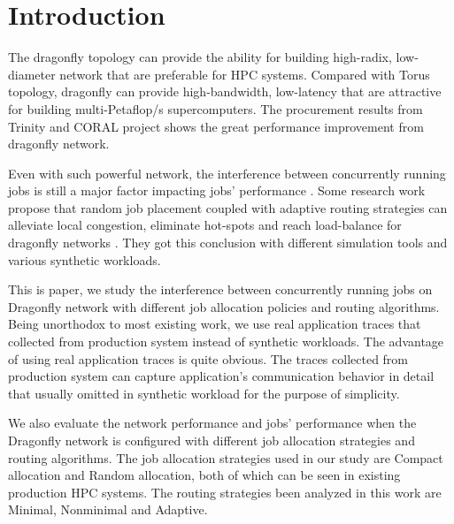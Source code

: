 \documentclass[conference,compsoc]{IEEEtran}
\begin{document}




%
\IEEEpeerreviewmaketitle



\section{Introduction}
\label{sec:intro}

The dragonfly topology can provide the ability for building high-radix, low-diameter network that are preferable for HPC systems. Compared with Torus topology, dragonfly can provide high-bandwidth, low-latency that are attractive for building multi-Petaflop/s supercomputers\cite{dally-dragonfly}. The procurement results from Trinity and CORAL project shows the great performance improvement from dragonfly network. 


Even with such powerful network, the interference between concurrently running jobs is still a major factor impacting jobs' performance \cite{bhatele2015, dskinner}. Some research work propose that random job placement coupled with adaptive routing strategies can alleviate local congestion, eliminate hot-spots and reach load-balance for dragonfly networks \cite{jain-sc14, bhatele-sc11, brandt2014}. They got this conclusion with different simulation tools and various synthetic workloads.

This is paper, we study the interference between concurrently running jobs on Dragonfly network with different job allocation policies and routing algorithms. Being unorthodox to most existing work, we use real application traces that collected from production system instead of synthetic workloads. The advantage of using real application traces is quite obvious. The traces collected from production system can capture application's communication behavior in detail that usually omitted in synthetic workload for the purpose of simplicity. 


We also evaluate the network performance and jobs' performance when the Dragonfly network is configured with different job allocation strategies and routing algorithms. The job allocation strategies used in our study are Compact allocation and Random allocation, both of which can be seen in existing production HPC systems. The routing strategies been analyzed in this work are Minimal, Nonminimal and Adaptive.  
\end{document}
